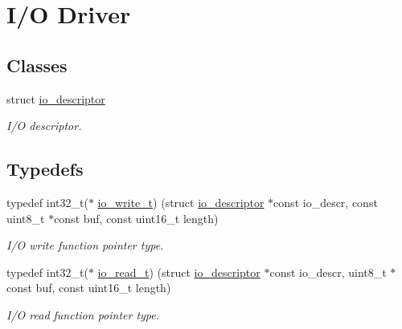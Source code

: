 \hypertarget{group__doc__driver__hal__helper__io}{}\section{I/O Driver}
\label{group__doc__driver__hal__helper__io}
\subsection*{Classes}
\begin{DoxyCompactItemize}
\item 
struct \hyperlink{structio__descriptor}{io\+\_\+descriptor}
\begin{DoxyCompactList}\small\item\em I/O descriptor. \end{DoxyCompactList}\end{DoxyCompactItemize}
\subsection*{Typedefs}
\begin{DoxyCompactItemize}
\item 
\mbox{\label{group__doc__driver__hal__helper__io_gacb03c48993a6786f00946c196c40add1}} 
typedef int32\+\_\+t($\ast$ \hyperlink{group__doc__driver__hal__helper__io_gacb03c48993a6786f00946c196c40add1}{io\+\_\+write\+\_\+t}) (struct \hyperlink{structio__descriptor}{io\+\_\+descriptor} $\ast$const io\+\_\+descr, const uint8\+\_\+t $\ast$const buf, const uint16\+\_\+t length)
\begin{DoxyCompactList}\small\item\em I/O write function pointer type. \end{DoxyCompactList}\item 
\mbox{\label{group__doc__driver__hal__helper__io_ga4d9ae58de2887289fe09eac6f0aa8be7}} 
typedef int32\+\_\+t($\ast$ \hyperlink{group__doc__driver__hal__helper__io_ga4d9ae58de2887289fe09eac6f0aa8be7}{io\+\_\+read\+\_\+t}) (struct \hyperlink{structio__descriptor}{io\+\_\+descriptor} $\ast$const io\+\_\+descr, uint8\+\_\+t $\ast$const buf, const uint16\+\_\+t length)
\begin{DoxyCompactList}\small\item\em I/O read function pointer type. \end{DoxyCompactList}\end{DoxyCompactItemize}
